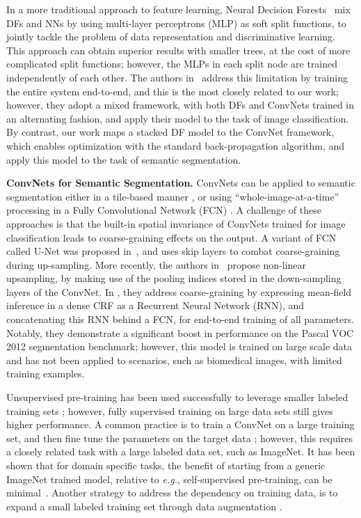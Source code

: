 \documentclass[twocolumn]{svjour3}
\begin{document}
In a more traditional approach to feature learning, Neural Decision Forests~\cite{BuloK14} mix DFs and NNs by using multi-layer perceptrons (MLP) as soft split functions, to jointly tackle the problem of data representation and discriminative learning.
This approach can obtain superior results with smaller trees, at the cost of more complicated split functions; however, the MLPs in each split node are trained independently of each other.
The authors in~\cite{DeepNDFs} address this limitation by training the entire system end-to-end, and this is the most closely related to our work; however, they adopt a mixed framework, with both DFs and ConvNets trained in an alternating fashion, and apply their model to the task of image classification.
By contrast, our work maps a stacked DF model to the ConvNet framework, which enables optimization with the standard back-propagation algorithm, and apply this model to the task of semantic segmentation.

\textbf{ConvNets for Semantic Segmentation.} Conv\-Nets can be applied to semantic segmentation either in a tile-based manner \cite{Ciresan}, or using ``whole-image-at-a-time'' processing in a Fully Convolutional Network (FCN) \cite{long_shelhamer_fcn_2015}.
A challenge of these approaches is that the built-in spatial invariance of ConvNets trained for image classification leads to coarse-graining effects on the output.
A variant of FCN called U-Net was proposed in~\cite{unet}, and uses skip layers to combat coarse-graining during up-sampling.
More recently, the authors in~\cite{Badrinarayanan:2015ub} propose non-linear upsampling, by making use of the pooling indices stored in the down-sampling layers of the ConvNet.
In \cite{Zheng, Arnab:2016uk}, they address coarse-graining by expressing mean-field inference in a dense CRF as a Recurrent Neural Network (RNN), and concatenating this RNN behind a FCN, for end-to-end training of all parameters. Notably, they demonstrate a significant boost in performance on the Pascal VOC 2012 segmentation benchmark; however, this model is trained on large scale data and has not been applied to scenarios, such as biomedical images, with limited training examples.

Unsupervised pre-training has been used successfully to leverage smaller labeled training sets \cite{Sermanet, Ranzato, Hinton:DeepBeliefNets}; however, fully supervised training on large data sets still gives higher performance.
A common practice is to train a ConvNet on a large training set, and then fine tune the parameters on the target data \cite{GirshickDDM14}; however, this requires a closely related task with a large labeled data set, such as ImageNet.
It has been shown that for domain specific tasks, the benefit of starting from a generic ImageNet trained model, relative to \textit{e.g.}, self-supervised pre-training, can be minimal~\cite{Sudowe:tc}.
Another strategy to address the dependency on training data, is to expand a small labeled training set through data augmentation \cite{unet}.
\end{document}
